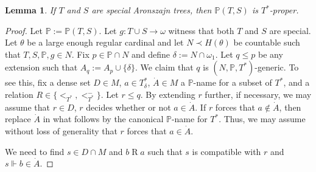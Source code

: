 \documentclass{amsart}
\newtheorem{lemma}[theorem]{Lemma}
\theoremstyle{definition}
\renewcommand{\P}{\mathbb{P}}
\begin{document}
\begin{lemma}
  If $T$ and $S$ are special Aronszajn trees,
  then $\P(T,S)$ is $T^{*}$-proper.
\end{lemma}
\begin{proof}
  Let $\P := \P(T,S)$.
  Let $g : T \cup S \to \omega$ witness that both $T$ and $S$
  are special.
  Let $\theta$ be a large enough regular cardinal and let $N \prec H(\theta)$ be
  countable such that $T,S,\P,g \in N$. Fix $p \in \P \cap N$
  and define $\delta := N \cap \omega_{1}$. Let
  $q \le p$ be any extension such that $A_{q} := A_{p} \cup \{\delta\}$. We claim that $q$ is $(N,\P,T^*)$-generic. To see this, fix a dense set $D\in M$, $a\in T^*_\delta $, $\dot A\in M$ a $\P$-name for a subset of $T^*$, and a relation $R\in\{<_{T^*},<_{T^*}^-\}$. Let $r\leq q$. By extending $r$ further, if necessary, we may assume that $r \in D$, $r$ decides whether or not $a \in\dot A$. If $r$ forces that $a \notin\dot A$, then replace $\dot A$ in what follows by the canonical $\P$-name for $T^*$. Thus, we may assume without loss of generality that $r$ forces that $a \in \dot A$.

We need to find $s\in D\cap M$ and $b \mathrel{R} a$ such that $s$ is compatible with $r$ and $s\Vdash b\in\dot A$.






\end{proof}
\end{document}
